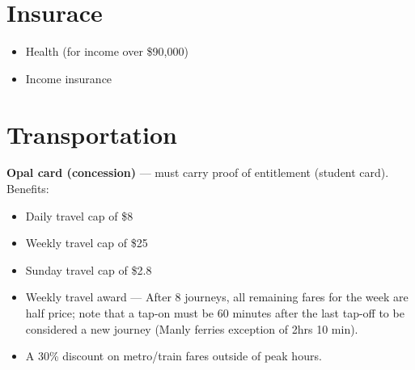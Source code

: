 \section{Insurace}
\begin{itemize}
	\item Health (for income over \$90,000)
	\item Income insurance
\end{itemize}

\section{Transportation}

\textbf{Opal card (concession)} --- must carry proof of entitlement (student card). Benefits:

\begin{itemize}
	\item Daily travel cap of \$8
	\item Weekly travel cap of \$25
	\item Sunday travel cap of \$2.8
	\item Weekly travel award --- After 8 journeys, all remaining fares for the week are half price; note that a tap-on must be 60 minutes after the last tap-off to be considered a new journey (Manly ferries exception of 2hrs 10 min).
	\item A 30\% discount on metro/train fares outside of peak hours.
\end{itemize}